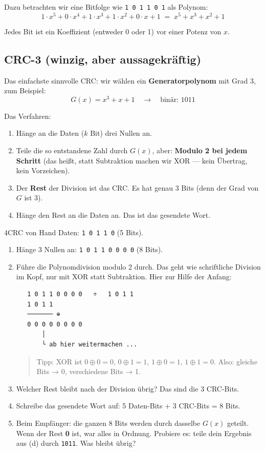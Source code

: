 Dazu betrachten wir eine Bitfolge wie \texttt{1 0 1 1 0 1} als
Polynom:
\[
  1 \cdot x^5 + 0 \cdot x^4 + 1 \cdot x^3 + 1 \cdot x^2 + 0 \cdot x + 1
  \;=\; x^5 + x^3 + x^2 + 1
\]

Jedes Bit ist ein Koeffizient (entweder 0 oder 1) vor einer Potenz
von $x$.

\subsection*{CRC-3 (winzig, aber aussagekräftig)}

Das einfachste sinnvolle CRC: wir wählen ein \textbf{Generatorpolynom}
mit Grad 3, zum Beispiel:
\[
  G(x) = x^3 + x + 1 \quad \to \quad \text{binär: } 1011
\]

Das Verfahren:

\begin{enumerate}
\item Hänge an die Daten ($k$ Bit) drei Nullen an.
\item Teile die so entstandene Zahl durch $G(x)$, aber: \textbf{Modulo
  2 bei jedem Schritt} (das heißt, statt Subtraktion machen wir XOR
  — kein Übertrag, kein Vorzeichen).
\item Der \textbf{Rest} der Division ist das CRC. Es hat genau 3 Bits
  (denn der Grad von $G$ ist 3).
\item Hänge den Rest an die Daten an. Das ist das gesendete Wort.
\end{enumerate}

\begin{bleistiftuebung}{4}{CRC von Hand}
Daten: \texttt{1 0 1 1 0} (5 Bits).

\begin{enumerate}[label=(\alph*), leftmargin=*]
\item Hänge 3 Nullen an: \texttt{1 0 1 1 0 0 0 0} (8 Bits).
\item Führe die Polynomdivision modulo 2 durch. Das geht wie
  schriftliche Division im Kopf, nur mit XOR statt Subtraktion. Hier
  zur Hilfe der Anfang:

  \begin{verbatim}
   1 0 1 1 0 0 0 0   ÷   1 0 1 1
   1 0 1 1
   ─────── ⊕
   0 0 0 0 0 0 0 0
       │
       └ ab hier weitermachen ...
  \end{verbatim}

  \begin{quote}
  Tipp: XOR ist $0 \oplus 0 = 0$, $0 \oplus 1 = 1$, $1 \oplus 0 = 1$,
  $1 \oplus 1 = 0$. Also: gleiche Bits → 0, verschiedene Bits → 1.
  \end{quote}

\item Welcher Rest bleibt nach der Division übrig? Das sind die 3
  CRC-Bits.
\item Schreibe das gesendete Wort auf: 5 Daten-Bits + 3 CRC-Bits = 8
  Bits.
\item Beim Empfänger: die ganzen 8 Bits werden durch dasselbe $G(x)$
  geteilt. Wenn der Rest \textbf{0} ist, war alles in Ordnung.
  Probiere es: teile dein Ergebnis aus (d) durch \texttt{1011}. Was
  bleibt übrig?
\end{enumerate}
\end{bleistiftuebung}

